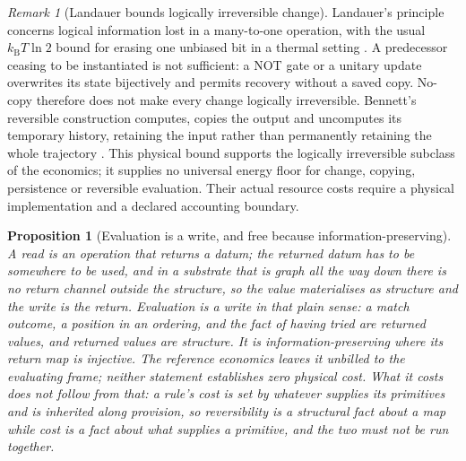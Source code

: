 \documentclass[11pt,a4paper]{article}
\newtheorem{proposition}[definition]{Proposition}
\theoremstyle{remark}\newtheorem{remark}[definition]{Remark}
\begin{document}
\begin{remark}[Landauer bounds logically irreversible change]\label{rem:landauer-change}
Landauer's principle concerns logical information lost in a many-to-one
operation, with the usual $k_{\mathrm B}T\ln 2$ bound for erasing one unbiased
bit in a thermal setting \citep{landauer1961}. A predecessor ceasing to be
instantiated is not sufficient: a NOT gate or a unitary update overwrites its
state bijectively and permits recovery without a saved copy. No-copy therefore
does not make every change logically irreversible. Bennett's reversible
construction computes, copies the output and uncomputes its temporary history,
retaining the input rather than permanently retaining the whole trajectory
\citep{bennett1973}. This physical bound supports the logically irreversible
subclass of the economics; it supplies no universal energy floor for change,
copying, persistence or reversible evaluation. Their actual resource costs
require a physical implementation and a declared accounting boundary.
\end{remark}

\begin{proposition}[Evaluation is a write, and free because information-preserving]\label{prop:evaluation-writes}
A read is an operation that returns a datum; the returned datum has to be somewhere to be used, and in
a substrate that is graph all the way down there is no return channel outside the structure, so the
value materialises as structure and the write is the return. Evaluation is a write in that plain
sense: a match outcome, a position in an ordering, and the fact of having tried are returned values,
and returned values are structure. It is information-preserving where its return map is injective. The reference economics leaves it unbilled to the evaluating frame; neither statement establishes zero physical cost. What it costs does not follow from that: a rule's
cost is set by whatever supplies its primitives and is inherited along provision, so reversibility is a
structural fact about a map while cost is a fact about what supplies a primitive, and the two must not
be run together.
\end{proposition}
\end{document}
